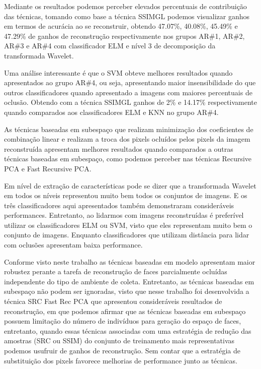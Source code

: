 Mediante os resultados podemos perceber elevados percentuais de contribuição das técnicas, tomando como base a técnica SSIMGL podemos visualizar ganhos em termos de acurácia ao se reconstruir, obtendo 47.07\%, 40.08\%, 45.49\% e 47.29\% de ganhos de reconstrução respectivamente nos grupos AR\#1, AR\#2, AR\#3 e AR\#4 com classificador ELM e nível 3 de decomposição da transformada Wavelet. 

Uma análise interessante é que o SVM obteve melhores resultados quando apresentados ao grupo AR\#4, ou seja, apresentando maior insensibilidade do que outros classificadores quando apresentado a imagens com maiores percentuais de oclusão. Obtendo com a técnica SSIMGL ganhos de 2\% e 14.17\% respectivamente quando comparados aos classificadores ELM e KNN no grupo AR\#4.

As técnicas baseadas em subespaço que realizam minimização dos coeficientes de combinação linear e realizam a troca dos pixels ocluídos pelos pixels da imagem reconstruída apresentam melhores resultados quando comparados a outras técnicas baseadas em subespaço, como podemos perceber nas técnicas Recursive PCA e Fast Recursive PCA. 

Em nível de extração de características pode se dizer que a transformada Wavelet em todos os níveis representou muito bem todos os conjuntos de imagens. E os três classificadores aqui apresentados também demonstraram consideráveis performances. Entretanto, ao lidarmos com imagens reconstruídas é preferível utilizar os classificadores ELM ou SVM, visto que eles representam muito bem o conjunto de imagens. Enquanto classificadores que utilizam distância para lidar com oclusões apresentam baixa performance.

Conforme visto neste trabalho as técnicas baseadas em modelo apresentam maior robustez perante a tarefa de reconstrução de faces parcialmente ocluídas independente do tipo de ambiente de coleta. Entretanto, as técnicas baseadas em subespaço não podem ser ignoradas, visto que nesse trabalho foi desenvolvida a técnica SRC Fast Rec PCA que apresentou consideráveis resultados de reconstrução, em que podemos afirmar que as técnicas baseadas em subespaço possuem limitação do número de indivíduos para geração do espaço de faces, entretanto, quando essas técnicas associadas com uma estratégia de redução das amostras (SRC ou SSIM) do conjunto de treinamento mais representativas podemos usufruir de ganhos de reconstrução. Sem contar que a estratégia de substituição dos pixels favorece melhorias de performance junto as técnicas.		




